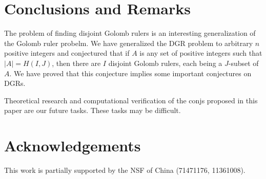 \documentclass[preprint,12pt]{elsarticle}
\begin{document}
\section{Conclusions and Remarks} \label{conclu}

The problem of finding disjoint Golomb rulers is
an interesting generalization of the Golomb ruler probelm.
We have generalized the DGR problem to arbitrary $n$ positive integers and conjectured
that if $A$ is any set of positive integers such that $|A| = H(I, J)$, then there are $I$ disjoint Golomb rulers, each being a $J$-subset of $A$.
We have proved that
this conjecture implies some important conjectures on DGRs.

Theoretical research and computational verification of the conjs proposed in this paper are our future tasks.
These tasks may be difficult.

\section*{Acknowledgements}
This work is partially supported by the NSF of China (71471176, 11361008).



\end{document}
